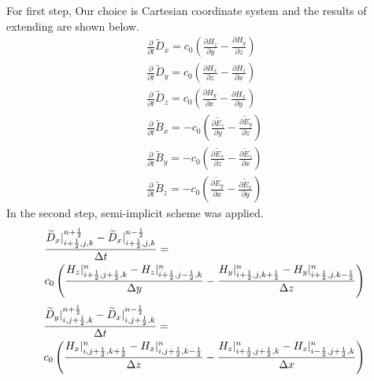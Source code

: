For first step, Our choice is Cartesian coordinate system and the results of extending are shown below.
\begin{gather}
  \frac{\partial}{\partial t}\widetilde{D}_x = c_0\left(\frac{\partial H_z}{\partial y} - \frac{\partial H_y}{\partial z}\right)\label{eq:up_d_x}\\
  \frac{\partial}{\partial t}\widetilde{D}_y = c_0\left(\frac{\partial H_x}{\partial z} - \frac{\partial H_z}{\partial x}\right)\label{eq:up_d_y}\\
  \frac{\partial}{\partial t}\widetilde{D}_z = c_0\left(\frac{\partial H_y}{\partial x} - \frac{\partial H_x}{\partial y}\right)\label{eq:up_d_z}\\
  \frac{\partial}{\partial t}\widetilde{B}_x =-c_0\left(\frac{\partial \widetilde{E}_z}{\partial y} - \frac{\partial \widetilde{E}_y}{\partial z}\right)\label{eq:up_b_x}\\
  \frac{\partial}{\partial t}\widetilde{B}_y =-c_0\left(\frac{\partial \widetilde{E}_x}{\partial z} - \frac{\partial \widetilde{E}_z}{\partial x}\right)\label{eq:up_b_y}\\
  \frac{\partial}{\partial t}\widetilde{B}_z =-c_0\left(\frac{\partial \widetilde{E}_y}{\partial x} - \frac{\partial \widetilde{E}_x}{\partial y}\right)\label{eq:up_b_z}
\end{gather}
In the second step, semi-implicit scheme was applied.
\begin{equation}
  \begin{split}
    \displaystyle & \frac{\widetilde{D}_x|_{i+\frac{1}{2},j,k}^{n+\frac{1}{2}} - \widetilde{D}_x|_{i+\frac{1}{2},j,k}^{n-\frac{1}{2}}}{\Delta t} = \\
    \displaystyle & c_0\left(\frac{H_z|_{i+\frac{1}{2},j+\frac{1}{2},k}^{n} - H_z|_{i+\frac{1}{2},j-\frac{1}{2},k}^{n}}{\Delta y} - \frac{H_y|_{i+\frac{1}{2},j,k+\frac{1}{2}}^{n} - H_y|_{i+\frac{1}{2},j,k-\frac{1}{2}}^{n}}{\Delta z}\right)\\
  \end{split}
\end{equation}
\begin{equation}
  \begin{split}
    \displaystyle & \frac{\widetilde{D}_y|_{i,j+\frac{1}{2},k}^{n+\frac{1}{2}} - \widetilde{D}_x|_{i,j+\frac{1}{2},k}^{n-\frac{1}{2}}}{\Delta t} = \\
    \displaystyle & c_0\left(\frac{H_x|_{i,j+\frac{1}{2},k+\frac{1}{2}}^{n} - H_x|_{i,j+\frac{1}{2},k-\frac{1}{2}}^{n}}{\Delta z} - \frac{H_z|_{i+\frac{1}{2},j+\frac{1}{2},k}^{n} - H_z|_{i-\frac{1}{2},j+\frac{1}{2},k}^{n}}{\Delta x}\right)\\
  \end{split}
\end{equation}
